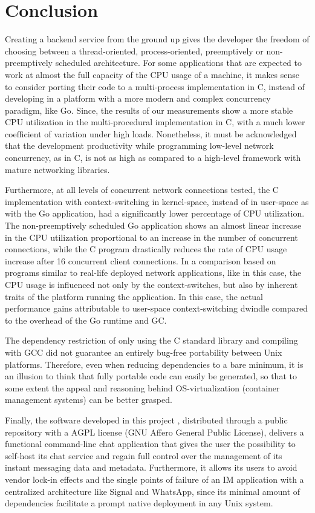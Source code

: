 \section{Conclusion}
Creating a backend service from the ground up gives the developer the freedom of choosing between a thread-oriented, process-oriented, preemptively or non-preemptively scheduled architecture. For some applications that are expected to work at almost the full capacity of the CPU usage of a machine, it makes sense to consider porting their code to a multi-process implementation in C, instead of developing in a platform with a more modern and complex concurrency paradigm, like Go. Since, the results of our measurements show a more stable CPU utilization in the multi-procedural implementation in C, with a much lower coefficient of variation under high loads.  Nonetheless, it must be acknowledged that the development productivity while programming low-level network concurrency, as in C, is not as high as compared to a high-level framework with mature networking libraries.

Furthermore, at all levels of concurrent network connections tested, the C implementation with context-switching in kernel-space, instead of in user-space as with the Go application, had a significantly lower percentage of CPU utilization. The non-preemptively scheduled Go application shows an almost linear increase in the CPU utilization proportional to an increase in the number of concurrent connections, while the C program drastically reduces the rate of CPU usage increase after 16 concurrent client connections. In a comparison based on programs similar to real-life deployed network applications, like in this case, the CPU usage is influenced not only by the context-switches, but also by inherent traits of the platform running the application. In this case, the actual performance gains attributable to user-space context-switching dwindle compared to the overhead of the Go runtime and GC.

The dependency restriction of only using the C standard library and compiling with GCC did not guarantee an entirely bug-free portability between Unix platforms. Therefore, even when reducing dependencies to a bare minimum, it is an illusion to think that fully portable code can easily be generated, so that to some extent the appeal and reasoning behind OS-virtualization (container management systems) can be better grasped.

Finally, the software developed in this project \cite{Rodriguez2022}, distributed through a public repository with a AGPL license (GNU Affero General Public License), delivers a functional command-line chat application that gives the user the possibility to self-host its chat service and regain full control over the management of its instant messaging data and metadata. Furthermore, it allows its users to avoid vendor lock-in effects and the single points of failure of an IM application with a centralized architecture like Signal and WhatsApp, since its minimal amount of dependencies facilitate a prompt native deployment in any Unix system.